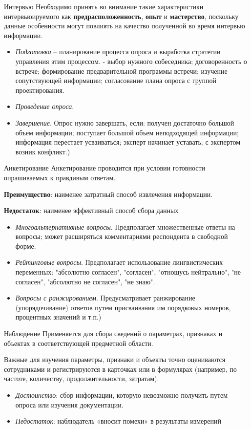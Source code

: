 \documentclass{beamer}
\begin{document}
\begin{frame}[t]{Интервью}
Необходимо принять во внимание такие характеристики интервьюируемого как
\textbf{предрасположенность}, \textbf{опыт} и \textbf{мастерство}, поскольку данные особенности могут
повлиять на качество полученной во время интервью информации. 
\begin{itemize}
\item \textit{Подготовка} – планирование процесса опроса и выработка стратегии управления
этим процессом. - выбор нужного собеседника; договоренность о встрече;
формирование предварительной программы встречи; изучение сопутствующей
информации; согласование плана опроса с группой проектирования.
\item \textit{Проведение опроса}.
\item \textit{Завершение}. Опрос нужно завершать, если: получен достаточно большой объем
информации; поступает большой объем неподходящей информации; информация
перестает усваиваться; эксперт начинает уставать; с экспертом возник конфликт.)
\end{itemize}
\end{frame}

\begin{frame}[t]{Анкетирование}
Анкетирование проводится при условии готовности опрашиваемых к правдивым ответам.

\textbf{Преимущество}: наименее затратный способ извлечения информации.

\textbf{Недостаток}: наименее эффективный способ сбора данных
\begin{itemize}
\item \textit{Многоальтернативные вопросы}. Предполагает множественные ответы на
вопросы; может расширяться комментариями респондента в свободной форме.
\item \textit{Рейтинговые вопросы}. Предполагает использование лингвистических
переменных: "абсолютно согласен", "согласен", "отношусь нейтрально", "не
согласен", "абсолютно не согласен", "не знаю".
\item \textit{Вопросы с ранжированием}. Предусматривает ранжирование (упорядочивание)
ответов путем присваивания им порядковых номеров, процентных значений и
т.п.)
\end{itemize}
\end{frame}

\begin{frame}[t]{Наблюдение}
Применяется для сбора сведений о параметрах, признаках и
объектах в соответствующей предметной области. 

Важные для изучения параметры, признаки и объекты точно оцениваются сотрудниками и регистрируются
в карточках или в формулярах (например, по частоте, количеству, продолжительности, затратам).
\begin{itemize}
\item \textit{Достоинство}: сбор информации, которую невозможно получить путем опроса или
изучения документации.
\item \textit{Недостаток}: наблюдатель «вносит помехи» в результаты измерений
\end{itemize}
\end{frame}
\end{document}
